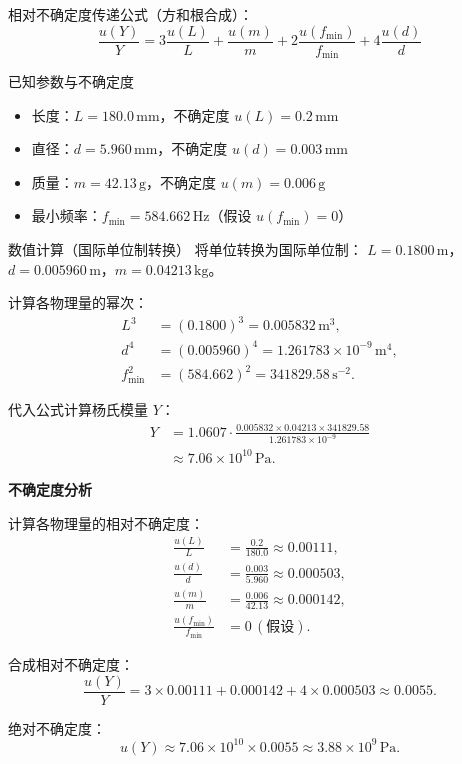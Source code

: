 \documentclass[11pt]{article}
\begin{document}
相对不确定度传递公式（方和根合成）：
\[ \frac{u(Y)}{Y} = 3\frac{u(L)}{L} + \frac{u(m)}{m} + 2\frac{u(f_{\text{min}})}{f_{\text{min}}} + 4\frac{u(d)}{d} \]


已知参数与不确定度
\begin{itemize}
    \item 长度：\( L = 180.0 \, \text{mm} \)，不确定度 \( u(L) = 0.2 \, \text{mm} \)
    \item 直径：\( d = 5.960 \, \text{mm} \)，不确定度 \( u(d) = 0.003 \, \text{mm} \)
    \item 质量：\( m = 42.13 \, \text{g} \)，不确定度 \( u(m) = 0.006 \, \text{g} \)
    \item 最小频率：\( f_{\text{min}} = 584.662 \, \text{Hz} \)（假设 \( u(f_{\text{min}}) = 0 \)）
\end{itemize}
数值计算（国际单位制转换）
将单位转换为国际单位制：
\( L = 0.1800 \, \text{m} \)，\( d = 0.005960 \, \text{m} \)，\( m = 0.04213 \, \text{kg} \)。

计算各物理量的幂次：
\begin{align*}
L^3 &= (0.1800)^3 = 0.005832 \, \text{m}^3, \\
d^4 &= (0.005960)^4 = 1.261783 \times 10^{-9} \, \text{m}^4, \\
f_{\text{min}}^2 &= (584.662)^2 = 341829.58 \, \text{s}^{-2}.
\end{align*}

代入公式计算杨氏模量 \( Y \)：
\begin{align*}
Y &= 1.0607 \cdot \frac{0.005832 \times 0.04213 \times 341829.58}{1.261783 \times 10^{-9}} \\
&\approx 7.06 \times 10^{10} \, \text{Pa}.
\end{align*}

\noindent\textbf{不确定度分析}

计算各物理量的相对不确定度：
\begin{align*}
\frac{u(L)}{L} &= \frac{0.2}{180.0} \approx 0.00111, \\
\frac{u(d)}{d} &= \frac{0.003}{5.960} \approx 0.000503, \\
\frac{u(m)}{m} &= \frac{0.006}{42.13} \approx 0.000142, \\
\frac{u(f_{\text{min}})}{f_{\text{min}}} &= 0 \, (\text{假设}).
\end{align*}

\noindent 合成相对不确定度：
\[
\frac{u(Y)}{Y} = 3 \times 0.00111 + 0.000142 + 4 \times 0.000503 \approx 0.0055.
\]

\noindent 绝对不确定度：
\[
u(Y) \approx 7.06 \times 10^{10} \times 0.0055 \approx 3.88 \times 10^9 \, \text{Pa}.
\]
\end{document}
